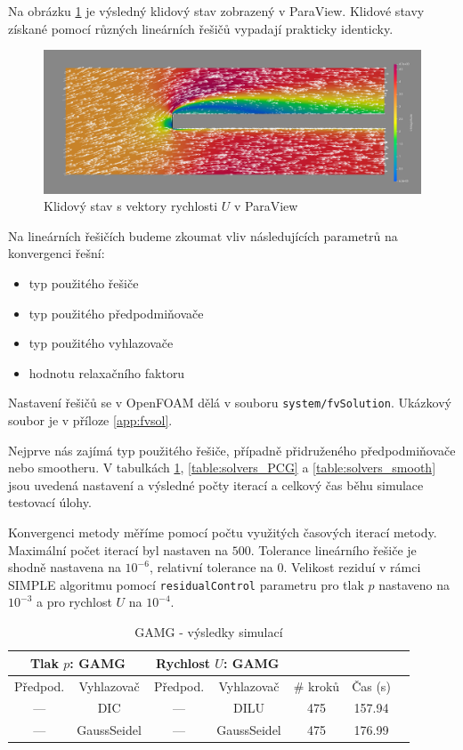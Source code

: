 \documentclass[a4paper,12pt]{report}
\theoremstyle{remark}
\begin{document}
Na obrázku \ref{fig:pv-GAMG-GS} je výsledný klidový stav zobrazený v ParaView. Klidové stavy získané pomocí různých lineárních řešičů vypadají prakticky identicky.	
	 \begin{figure}[H]
		\centering
		\includegraphics[width=1\linewidth]{pv-GAMG-GS.png}
		\caption{Klidový stav s vektory rychlosti $U$ v ParaView}
		\label{fig:pv-GAMG-GS}
	\end{figure}
Na lineárních řešičích budeme zkoumat vliv následujících parametrů na konvergenci řešní:
 \begin{itemize}
	\item typ použitého řešiče
	\item typ použitého předpodmiňovače
	\item typ použitého vyhlazovače
	\item hodnotu relaxačního faktoru
\end{itemize}
Nastavení řešičů se v OpenFOAM dělá v souboru \texttt{system/fvSolution}. Ukázkový soubor je v příloze \ref{app:fvsol}.
	
 Nejprve nás zajímá typ použitého řešiče, případně přidruženého předpodmiňovače nebo smootheru. V tabulkách \ref{table:solvers_GAMG}, \ref{table:solvers_PCG} a \ref{table:solvers_smooth} jsou uvedená nastavení a výsledné počty iterací a celkový čas běhu simulace testovací úlohy.
 
 Konvergenci metody měříme pomocí počtu využitých časových iterací metody. Maximální počet iterací byl nastaven na $500$. Tolerance lineárního řešiče je shodně nastavena na $10^{-6}$, relativní tolerance na $0$. Velikost reziduí v rámci SIMPLE algoritmu pomocí \texttt{residualControl} parametru pro tlak $p$ nastaveno na $10^{-3}$ a pro rychlost $U$ na $10^{-4}$.

 \begin{table}[H]
	\centering
	\caption{GAMG - výsledky simulací}
	\renewcommand{\arraystretch}{1.9}
	\begin{tabular}{*7c}
		\toprule
		\multicolumn{2}{c}{Tlak $p$: \textbf{GAMG}} & \multicolumn{2}{c}{Rychlost $U$: \textbf{GAMG}}\\		
		\midrule
		Předpod.&Vyhlazovač&Předpod.&Vyhlazovač&\# kroků&Čas (s)\\
		\midrule
		 --- & DIC & --- &  DILU & 475 &157.94\\		
		 --- & GaussSeidel &  --- & GaussSeidel & 475&176.99\\
		\bottomrule
\end{tabular}
\label{table:solvers_GAMG}
\end{table}
\end{document}
